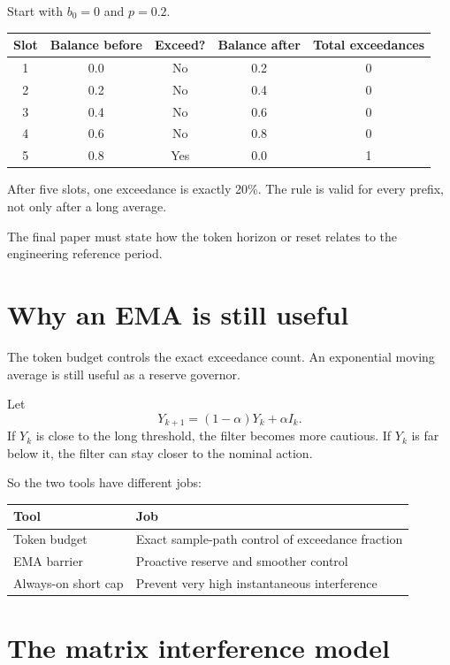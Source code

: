 \documentclass[11pt]{article}
\begin{document}
Start with $b_0=0$ and $p=0.2$.

\begin{center}
\begin{tabular}{ccccc}
\toprule
Slot & Balance before & Exceed? & Balance after & Total exceedances\\
\midrule
1 & 0.0 & No & 0.2 & 0\\
2 & 0.2 & No & 0.4 & 0\\
3 & 0.4 & No & 0.6 & 0\\
4 & 0.6 & No & 0.8 & 0\\
5 & 0.8 & Yes & 0.0 & 1\\
\bottomrule
\end{tabular}
\end{center}

After five slots, one exceedance is exactly 20\%. The rule is valid for every prefix, not only after a long average.

The final paper must state how the token horizon or reset relates to the engineering reference period.

\section{Why an EMA is still useful}

The token budget controls the exact exceedance count. An exponential moving average is still useful as a reserve governor.

Let
\begin{equation}
 Y_{k+1}=(1-\alpha)Y_k+\alpha I_k.
\end{equation}
If $Y_k$ is close to the long threshold, the filter becomes more cautious. If $Y_k$ is far below it, the filter can stay closer to the nominal action.

So the two tools have different jobs:

\begin{center}
\begin{tabular}{ll}
\toprule
Tool & Job\\
\midrule
Token budget & Exact sample-path control of exceedance fraction\\
EMA barrier & Proactive reserve and smoother control\\
Always-on short cap & Prevent very high instantaneous interference\\
\bottomrule
\end{tabular}
\end{center}

\section{The matrix interference model}
\end{document}
